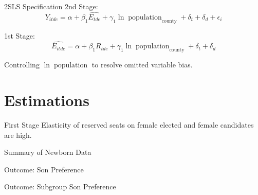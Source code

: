 \documentclass[
  10pt,
  ignorenonframetext,
  aspectratio=43,
]{beamer}
\begin{document}
\begin{frame}{2SLS Specification}
\protect\hypertarget{sls-specification}{}
2nd Stage: \[
Y_{itde} = \alpha + \beta_1 \hat{E_{tde}} + \gamma_1 \ln \operatorname{population}_{\text{county}} + \delta_t + \delta_{d} + \epsilon_i
\]

1st Stage: \[
\hat{E_{itde}} = \alpha + \beta_1 R_{tde}  + \gamma_1 \ln \operatorname{population}_{\text{county}} + \delta_t + \delta_{d}
\]

Controlling \(\ln \operatorname{population}\) to resolve omitted
variable bias.
\end{frame}

\hypertarget{estimations}{%
\section{Estimations}\label{estimations}}

\begin{frame}{First Stage}
\protect\hypertarget{first-stage}{}
Elasticity of reserved seats on female elected and female candidates are
high.


\end{frame}

\begin{frame}{Summary of Newborn Data}
\protect\hypertarget{summary-of-newborn-data}{}

\end{frame}

\begin{frame}{Outcome: Son Preference}
\protect\hypertarget{outcome-son-preference}{}

\end{frame}

\begin{frame}{Outcome: Subgroup Son Preference}
\protect\hypertarget{outcome-subgroup-son-preference}{}

\end{frame}
\end{document}
